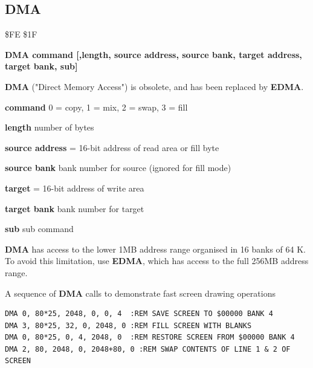 \subsection{DMA}
\label{BASIC 65 Commands!DMA}
\begin{description}[leftmargin=2cm,style=nextline]
\item [Token:] \$FE \$1F
\item [Format:] {\bf DMA command [,length, source address,
                 source bank, target address, target bank, sub]}
\item [Usage:]
   {\bf DMA} ("Direct Memory Access") is obsolete,
   and has been replaced by {\bf EDMA}.

   {\bf command} 0 = copy, 1 = mix, 2 = swap, 3 = fill

   {\bf length} number of bytes

   {\bf source address} = 16-bit address of read area or fill byte

   {\bf source bank} bank number for source (ignored for fill mode)

   {\bf target} = 16-bit address of write area

   {\bf target bank} bank number for target

   {\bf sub} sub command

\item [Remarks:]
{\bf DMA} has access to the lower 1MB address range
organised in 16 banks of 64 K. To avoid this limitation, use
{\bf EDMA}, which has access to the full 256MB address range.

\item [Examples:] A sequence of {\bf DMA} calls to demonstrate fast screen drawing operations
\begin{tcolorbox}[colback=black,coltext=white]
\verbatimfont{\codefont}
\begin{verbatim}
DMA 0, 80*25, 2048, 0, 0, 4  :REM SAVE SCREEN TO $00000 BANK 4
DMA 3, 80*25, 32, 0, 2048, 0 :REM FILL SCREEN WITH BLANKS
DMA 0, 80*25, 0, 4, 2048, 0  :REM RESTORE SCREEN FROM $00000 BANK 4
DMA 2, 80, 2048, 0, 2048+80, 0 :REM SWAP CONTENTS OF LINE 1 & 2 OF SCREEN
\end{verbatim}
\end{tcolorbox}
\end{description}


\newpage
